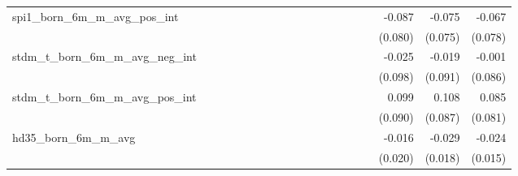 \begin{tabular}{lrrrrrrrrrrrrrrrrrr}
spi1\_born\_6m\_m\_avg\_pos\_int            &             &             &             &             &             &             &             &             &             &             &             &             &             &             &             &      -0.087 &      -0.075 &      -0.067 \\ 
                                            &             &             &             &             &             &             &             &             &             &             &             &             &             &             &             &     (0.080) &     (0.075) &     (0.078) \\ 
stdm\_t\_born\_6m\_m\_avg\_neg\_int         &             &             &             &             &             &             &             &             &             &             &             &             &             &             &             &      -0.025 &      -0.019 &      -0.001 \\ 
                                            &             &             &             &             &             &             &             &             &             &             &             &             &             &             &             &     (0.098) &     (0.091) &     (0.086) \\ 
stdm\_t\_born\_6m\_m\_avg\_pos\_int         &             &             &             &             &             &             &             &             &             &             &             &             &             &             &             &       0.099 &       0.108 &       0.085 \\ 
                                            &             &             &             &             &             &             &             &             &             &             &             &             &             &             &             &     (0.090) &     (0.087) &     (0.081) \\ 
hd35\_born\_6m\_m\_avg                      &             &             &             &             &             &             &             &             &             &             &             &             &             &             &             &      -0.016 &      -0.029 &      -0.024 \\ 
                                            &             &             &             &             &             &             &             &             &             &             &             &             &             &             &             &     (0.020) &     (0.018) &     (0.015) \\ 

\end{tabular}
